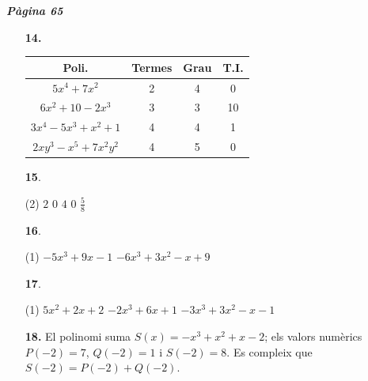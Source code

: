 \documentclass[a4paper, pdf, twoside]{book}
\begin{document}
\begin{multicols}{2}

{\textbf{\em Pàgina 65}} \hrulefill
\begin{enumerate}
\vspace{0.25cm}
\item[\fontfamily{phv}\selectfont\color{blue}\textbf{14. }] 
 \begin {tabular}{|c|c|c|c|} \hline \rowcolor {lightgray} Poli. & Termes & Grau & T.I. \\ \hline $5x^{4} +7x^{2}$ & 2 & 4 & 0 \\ \hline $6x^{2} +10-2x^{3} $ & 3 & 3 & 10 \\ \hline $3x^{4}-5x^{3}+x^2+1 $ & 4 & 4 & 1 \\ \hline $2xy^{3} -x^{5} +7x^{2} y^{2}$ & 4 & 5 & 0 \\ \hline \end {tabular}
 \end{enumerate}
\begin{enumerate}
\vspace{0.25cm}



 \item[\fontfamily{phv}\selectfont\color{blue}\textbf{15}. ] 
 \begin{tasks}[column-sep=1em, item-indent=1.3333em](2)
	 \task $2$
	 \task $0$
	 \task $4$
	 \task $0$
	 \task $\frac {5}{8}$
\end{tasks}
\vspace{0.25cm}



 \item[\fontfamily{phv}\selectfont\color{blue}\textbf{16}. ] 
 \begin{tasks}[column-sep=1em, item-indent=1.3333em](1)
	 \task $-5x^3+9x-1$
	 \task $-6x^3+3x^2-x+9$
\end{tasks}
\vspace{0.25cm}



 \item[\fontfamily{phv}\selectfont\color{blue}\textbf{17}. ] 
 \begin{tasks}[column-sep=1em, item-indent=1.3333em](1)
	 \task $5x^2+2x+2$
	 \task $-2x^3+6x+1$
	 \task $-3x^3+3x^2-x-1$
\end{tasks}
\vspace{0.25cm}
\item[\fontfamily{phv}\selectfont\color{blue}\textbf{18. }] 
El polinomi suma $S(x)=-x^3+x^2+x-2$; els valors numèrics $P(-2)=7$, $Q(-2)=1$ i $S(-2)=8$. Es compleix que $S(-2)=P(-2)+Q(-2)$. 
\vspace{0.25cm}



\end{enumerate}
\end{multicols}
\end{document}
